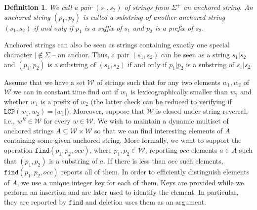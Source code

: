 \documentclass[a4paper]{article}
\newtheorem{definition}[theorem]{Definition}
\theoremstyle{remark}
\newcommand{\lcpop}{\mathtt{LCP}}
\newcommand{\anchfind}{\mathtt{find}}
\newcommand{\coll}{\mathcal{W}}
\begin{document}
\begin{definition}
  We call a pair $(s_1,s_2)$ of strings from $\Sigma^+$ an \emph{anchored}
  string.
  An anchored string $(p_1,p_2)$
  is called a \emph{substring}
  of another anchored string $(s_1,s_2)$ if and only if
  $p_1$ is a suffix of $s_1$ and $p_2$ is a prefix of $s_2$.
\end{definition}

Anchored strings can also be seen as strings containing exactly
one special character $|\notin \Sigma$ -- an anchor.
Thus, a pair $(s_1,s_2)$ can be seen as a string $s_1|s_2$ and
$(p_1,p_2)$ is a substring of $(s_1,s_2)$ if and only if
$p_1|p_2$ is a substring of $s_1|s_2$.

Assume that we have a set $\coll$ of strings such that for any two elements $w_1,w_2$
of $\coll$ we can in constant time find out if $w_1$ is lexicographically smaller than $w_2$
and whether $w_1$ is a prefix of $w_2$ (the latter check can be reduced to verifying if $\lcpop(w_1,w_2)=|w_1|$).
Moreover, suppose that $\coll$ is closed under string reversal, i.e., $w^R\in \coll$ for every $w\in \coll$.
We wish to maintain a dynamic multiset of anchored strings $A\subseteq \coll\times \coll$
so that we can find
interesting elements of $A$ containing some given anchored string.
More formally, we want to support the operation $\anchfind(p_1,p_2,occ)$,
where $p_1,p_2\in \coll$, reporting $occ$ elements $a\in A$ such that $(p_1,p_2)$
is a substring of $a$.
If there is less than $occ$ such elements, $\anchfind(p_1,p_2,occ)$ reports
all of them.
In order to efficiently distinguish elements of $A$, we use a unique integer key
for each of them. Keys are provided while we perform an insertion and are later used
to identify the element. In particular, they are reported by $\anchfind$
and deletion uses them as an argument.
\end{document}
